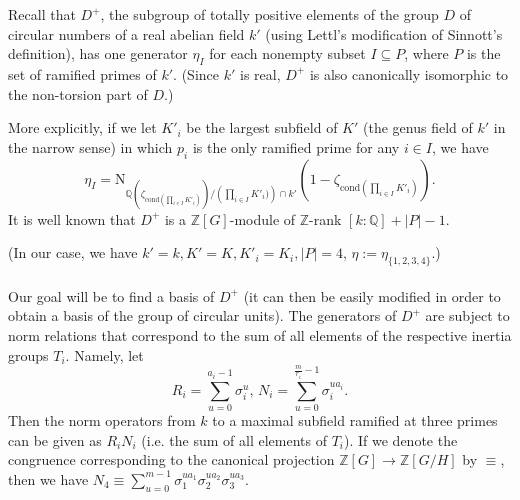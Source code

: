 \documentclass[12pt,a4paper]{article}
\newcommand{\Qbb}{\mathbb{Q}}
\newcommand{\Zbb}{\mathbb{Z}}
\newcommand{\Z}{\mathbb{Z}}
\begin{document}
Recall that $D^+$, the subgroup of totally positive elements of the group $D$ of circular numbers of a real abelian field $k'$ (using Lettl's modification of Sinnott's definition), has one generator $\eta_I$ for each nonempty subset $I\subseteq P$, where $P$ is the set of ramified primes of $k'$. (Since $k'$ is real, $D^+$ is also canonically isomorphic to the non-torsion part of $D$.) 

More explicitly, if we let $K'_i$ be the largest subfield of $K'$ (the genus field of $k'$ in the narrow sense) in which $p_i$ is the only ramified prime for any $i\in I$, we have
$$\eta_I=\text{N}_{\Qbb(\zeta_{\text{cond} \left(\prod_{i\in I}K'_i\right)})/\left(\prod_{i\in I}K'_i)\right)\cap k'}\left(1-\zeta_{\text{cond} \left(\prod_{i\in I}K'_i\right)}\right).$$
It is well known that $D^+$ is a $\Zbb[G]$-module of $\Zbb$-rank $[k:\Qbb]+|P|-1$. 

(In our case, we have $k'=k, K'=K, K'_i=K_i, |P|=4$, $\eta:=\eta_{\{1,2,3,4\}}$.)


\paragraph*{}
Our goal will be to find a basis of $D^+$ (it can then be easily modified in order to obtain a basis of the group of circular units). The generators of $D^+$ are subject to norm relations that correspond to the sum of all elements of the respective inertia groups $T_i$. Namely, let $$R_i=\sum_{u=0}^{a_i-1}\sigma_i^u,\, N_i=\sum_{u=0}^{\frac{m}{r_i}-1}\sigma_i^{ua_i}.$$ 
Then the norm operators from $k$ to a maximal subfield ramified at three primes can be given as $R_iN_i$ (i.e. the sum of all elements of $T_i$). If we denote the congruence corresponding to the canonical projection $\Z[G]\to \Z[G/H]$ by $\equiv$, then we have $N_4\equiv \sum_{u=0}^{m-1}\sigma_1^{ua_1}\sigma_2^{ua_2}\sigma_3^{ua_3}$.
\end{document}
